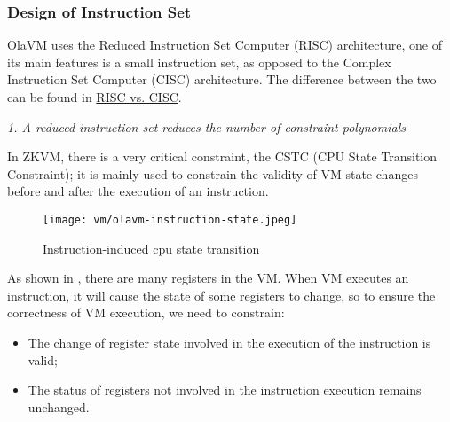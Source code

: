 \subsubsection{Design of Instruction Set} \label{sec:design-instruction-set}

OlaVM uses the Reduced Instruction Set Computer (RISC) architecture, one of its main features is a small instruction set, as opposed to the Complex Instruction Set Computer (CISC) architecture.
The difference between the two can be found in \href{https://cs.stanford.edu/people/eroberts/courses/soco/projects/risc/risccisc/}{RISC vs. CISC}.

\emph{1. A reduced instruction set reduces the number of constraint polynomials}

In ZKVM, there is a very critical constraint, the CSTC (CPU State Transition Constraint); it is mainly used to constrain the validity
of VM state changes before and after the execution of an instruction.

\begin{figure}[!ht]
    \centering
    \texttt{[image: vm/olavm-instruction-state.jpeg]}
    \caption{Instruction-induced cpu state transition}
    \label{fig:instruction-cpu-state-transition}
\end{figure}

As shown in , there are many registers in the VM. When VM executes an instruction, it will
cause the state of some registers to change, so to ensure the correctness of VM execution, we need to constrain:
\begin{itemize}
    \item The change of register state involved in the execution of the instruction is valid;
    \item The status of registers not involved in the instruction execution remains unchanged.
\end{itemize}

